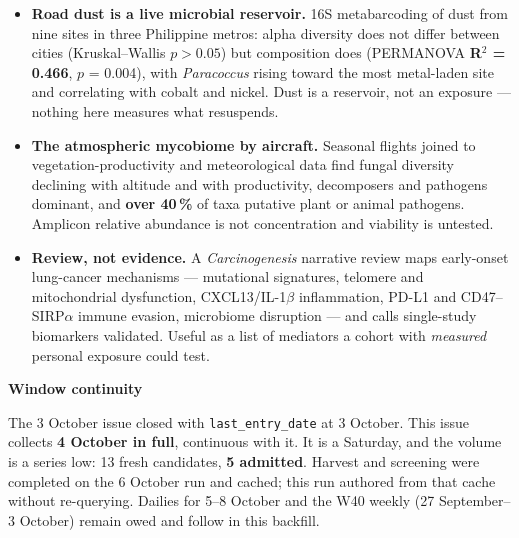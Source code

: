 \documentclass[10pt]{article}
\begin{document}
\footnotesize
\begin{itemize}

\item \textbf{Road dust is a live microbial reservoir.} 16S metabarcoding of dust from nine sites in three
Philippine metros: alpha diversity does not differ between cities (Kruskal--Wallis $p>0.05$) but composition
does (PERMANOVA \textbf{R$^2$ = 0.466}, $p$ = 0.004), with \textit{Paracoccus} rising toward the most
metal-laden site and correlating with cobalt and nickel. Dust is a reservoir, not an exposure --- nothing
here measures what resuspends.

\item \textbf{The atmospheric mycobiome by aircraft.} Seasonal flights joined to vegetation-productivity and
meteorological data find fungal diversity declining with altitude and with productivity, decomposers and
pathogens dominant, and \textbf{over 40\,\%} of taxa putative plant or animal pathogens. Amplicon relative
abundance is not concentration and viability is untested.

\item \textbf{Review, not evidence.} A \textit{Carcinogenesis} narrative review maps early-onset lung-cancer
mechanisms --- mutational signatures, telomere and mitochondrial dysfunction, CXCL13/IL-1$\beta$
inflammation, PD-L1 and CD47--SIRP$\alpha$ immune evasion, microbiome disruption --- and calls single-study
biomarkers validated. Useful as a list of mediators a cohort with \textit{measured} personal exposure
could test.

\end{itemize}

\vspace{2mm}

\begin{keybox}
{\sffamily\bfseries\footnotesize\color{Deep}Window continuity}\\[1.2mm]
{\fontsize{7.2}{8.8}\selectfont
The 3 October issue closed with \texttt{last\_entry\_date} at 3 October. This issue collects
\textbf{4 October in full}, continuous with it. It is a Saturday, and the volume is a series low: 13 fresh
candidates, \textbf{5 admitted}. Harvest and screening were completed on the 6 October run and cached;
this run authored from that cache without re-querying. Dailies for 5--8 October and the W40 weekly
(27 September--3 October) remain owed and follow in this backfill.\par}
\end{keybox}
\end{document}
